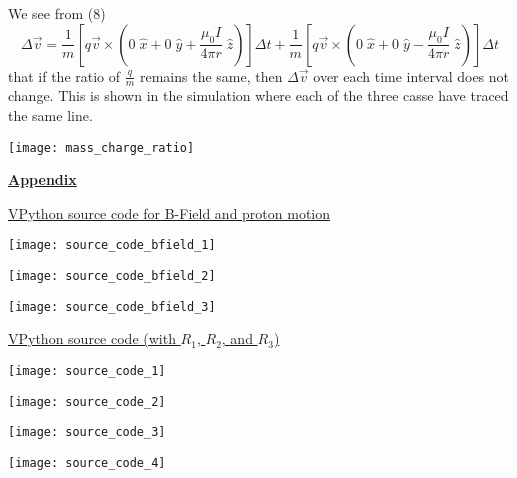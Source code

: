 \documentclass[11pt]{article}
\begin{document}
\noindent We see from (8)
\[
\Delta\vec{v}=\frac{1}{m}\left[q\vec{v}\times\left(0\;\hat{x}+0\;\hat{y}+\frac{\mu_0I}{4\pi r}\;\hat{z}\right)\right]\Delta t + \frac{1}{m}\left[q\vec{v}\times\left(0\;\hat{x}+0\;\hat{y}-\frac{\mu_0I}{4\pi r}\;\hat{z}\right)\right]\Delta t
\]
\noindent that if the ratio of $\frac{q}{m}$ remains the same, then $\Delta\vec{v}$ over each time interval does not change. This is shown in the simulation where each of the three casse have traced the same line.
\vspace{.5in}

\begin{center}
\texttt{[image: mass\_charge\_ratio]}
\end{center}

\newpage

\begin{center}
{\bf\Large\underline{Appendix}}
\vspace{.2in}

\underline{VPython source code for B-Field and proton motion}
\end{center}
\vspace{.3in}

\begin{center}
\texttt{[image: source\_code\_bfield\_1]}

\texttt{[image: source\_code\_bfield\_2]}

\texttt{[image: source\_code\_bfield\_3]}
\end{center}

\newpage

\begin{center}
\underline{VPython source code (with $R_1$, $R_2$, and $R_3$)}
\end{center}
\vspace{.3in}

\begin{center}
\texttt{[image: source\_code\_1]}
\end{center}
\begin{center}
\texttt{[image: source\_code\_2]}
\end{center}
\begin{center}
\texttt{[image: source\_code\_3]}
\end{center}
\begin{center}
\texttt{[image: source\_code\_4]}
\end{center}
\end{document}

